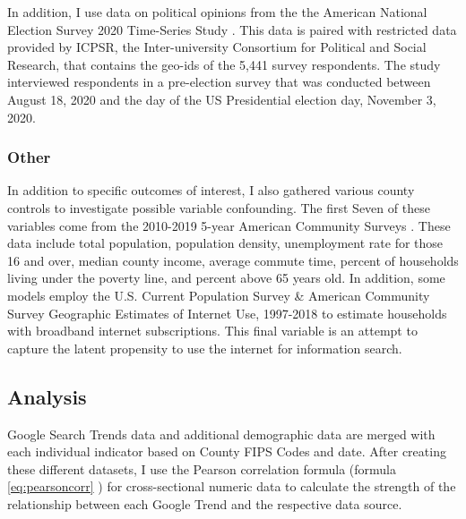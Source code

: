 In addition, I use data on political opinions from the the American National
Election Survey 2020 Time-Series Study \citep{anes_data}. This data is paired with
restricted data provided by ICPSR, the Inter-university Consortium for Political
and Social Research, that contains the geo-ids of the 5,441
survey respondents. The study interviewed respondents in a pre-election survey
that was conducted between August 18, 2020 and the day of the US Presidential
election day, November 3, 2020.


\subsubsection{Other}

In addition to specific outcomes of interest, I also gathered various county
controls to investigate possible variable confounding. The first Seven of these
variables come from the 2010-2019 5-year American Community Surveys
\citep{acs2019, acs2018, acs2017, acs2016, acs2015, acs2014, acs2013, acs2012, acs2011, acs2010}. 
These data include total population, population density,
unemployment rate for those 16 and over, median county income, average commute
time, percent of households living under the poverty line, and percent above 65
years old. In addition, some models employ the U.S. Current Population Survey \&
American Community Survey Geographic Estimates of Internet Use, 1997-2018
\citep{internet_use} to estimate households with broadband internet subscriptions.
This final variable is an attempt to capture the latent propensity to use the
internet for information search.


\subsection{Analysis}
Google Search Trends data and additional demographic data are merged with each
individual indicator based on County FIPS Codes and date. After creating these
different datasets, I use the Pearson correlation formula (formula \eqref{eq:pearsoncorr}
) for cross-sectional numeric data to calculate the
strength of the relationship between each Google Trend and the respective
data source.

